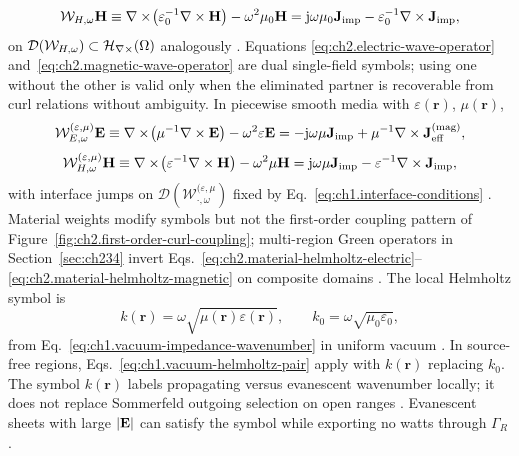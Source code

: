 \begin{equation}
\label{eq:ch2.magnetic-wave-operator}
\mathcal{W}_{H,\omega}\mathbf{H}\equiv
\nabla\times\!\left(\varepsilon_0^{-1}\nabla\times\mathbf{H}\right)-\omega^2\mu_0\mathbf{H}
= \mathrm{j}\omega\mu_0\mathbf{J}_{\mathrm{imp}}-\varepsilon_0^{-1}\nabla\times\mathbf{J}_{\mathrm{imp}},
\end{equation}
on \(\mathcal{D}(\mathcal{W}_{H,\omega})\subset\mathcal{H}_{\nabla\times}(\Omega)\) analogously
\cite{stratton1941}. Equations
\eqref{eq:ch2.electric-wave-operator} and~\eqref{eq:ch2.magnetic-wave-operator}
are dual single-field symbols; using one without the other is valid only when the
eliminated partner is recoverable from curl relations without ambiguity. In piecewise smooth media with \(\varepsilon(\mathbf{r})\), \(\mu(\mathbf{r})\),
\begin{equation}
\label{eq:ch2.material-helmholtz-electric}
\mathcal{W}_{E,\omega}^{(\varepsilon,\mu)}\mathbf{E}\equiv
\nabla\times\!\left(\mu^{-1}\nabla\times\mathbf{E}\right)-\omega^2\varepsilon\mathbf{E}
= -\mathrm{j}\omega\mu\mathbf{J}_{\mathrm{imp}}+\mu^{-1}\nabla\times\mathbf{J}^{\mathrm{(mag)}}_{\mathrm{eff}},
\end{equation}
\begin{equation}
\label{eq:ch2.material-helmholtz-magnetic}
\mathcal{W}_{H,\omega}^{(\varepsilon,\mu)}\mathbf{H}\equiv
\nabla\times\!\left(\varepsilon^{-1}\nabla\times\mathbf{H}\right)-\omega^2\mu\mathbf{H}
= \mathrm{j}\omega\mu\mathbf{J}_{\mathrm{imp}}-\varepsilon^{-1}\nabla\times\mathbf{J}_{\mathrm{imp}},
\end{equation}
with interface jumps on \(\mathcal{D}(\mathcal{W}_{\cdot,\omega}^{(\varepsilon,\mu})\)
fixed by Eq.~\eqref{eq:ch1.interface-conditions} \cite{stratton1941}. Material
weights modify symbols but not the first-order coupling pattern of
Figure~\ref{fig:ch2.first-order-curl-coupling}; multi-region Green operators in
Section~\ref{sec:ch234} invert Eqs.~\eqref{eq:ch2.material-helmholtz-electric}--\eqref{eq:ch2.material-helmholtz-magnetic}
on composite domains \cite{harrington2001}.
The local Helmholtz symbol is
\begin{equation}
\label{eq:ch2.helmholtz-symbol}
k(\mathbf{r})=\omega\sqrt{\mu(\mathbf{r})\varepsilon(\mathbf{r})},
\qquad
k_0=\omega\sqrt{\mu_0\varepsilon_0},
\end{equation}
from Eq.~\eqref{eq:ch1.vacuum-impedance-wavenumber} in uniform vacuum
\cite{stratton1941}. In source-free regions,
Eqs.~\eqref{eq:ch1.vacuum-helmholtz-pair} apply with
\(k(\mathbf{r})\) replacing \(k_0\). The symbol \(k(\mathbf{r})\) labels propagating
versus evanescent wavenumber locally; it does not replace Sommerfeld outgoing selection on
open ranges \cite{stratton1941}. Evanescent sheets with large $|\mathbf{E}|$ can
satisfy the symbol while exporting no watts through $\Gamma_R$ \cite{chu1948}.
